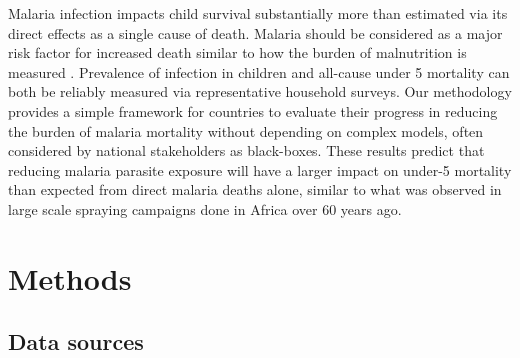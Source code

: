 \documentclass[12pt]{article}
\begin{document}
Malaria infection impacts child survival substantially more than estimated via its direct effects as a single cause of death. Malaria should be considered as a major risk factor for increased death similar to how the burden of malnutrition is measured \cite{ritchie:24}. Prevalence of infection in children and all-cause under 5 mortality can both be reliably measured via representative household surveys. Our methodology provides a simple framework for countries to evaluate their progress in reducing the burden of malaria mortality without depending on complex models, often considered by national stakeholders as black-boxes. These results predict that reducing malaria parasite exposure will have a larger impact on under-5 mortality than expected from direct malaria deaths alone, similar to what was observed in large scale spraying campaigns done in Africa over 60 years ago.

\section*{Methods}


\subsection*{Data sources}
\end{document}
